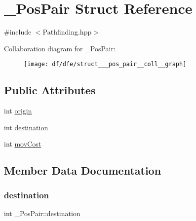 \hypertarget{struct___pos_pair}{}\section{\+\_\+\+Pos\+Pair Struct Reference}
\label{struct___pos_pair}


{\ttfamily \#include $<$Pathfinding.\+hpp$>$}



Collaboration diagram for \+\_\+\+Pos\+Pair\+:\nopagebreak
\begin{figure}[H]
\begin{center}
\leavevmode
\texttt{[image: df/dfe/struct\_\_\_pos\_pair\_\_coll\_\_graph]}
\end{center}
\end{figure}
\subsection*{Public Attributes}
\begin{DoxyCompactItemize}
\item 
int \mbox{\hyperlink{struct___pos_pair_a18ef19735976df84d1dda3185b844da0}{origin}}
\item 
int \mbox{\hyperlink{struct___pos_pair_a124d06bcfd8e7be752f9d32c0a7ce1bf}{destination}}
\item 
int \mbox{\hyperlink{struct___pos_pair_abf7f6970e1ace7a4f1cdc3179886e21d}{mov\+Cost}}
\end{DoxyCompactItemize}


\subsection{Member Data Documentation}
\mbox{\label{struct___pos_pair_a124d06bcfd8e7be752f9d32c0a7ce1bf}} 
\subsubsection{\texorpdfstring{destination}{destination}}
{\footnotesize\ttfamily int \+\_\+\+Pos\+Pair\+::destination}

\mbox{\label{struct___pos_pair_abf7f6970e1ace7a4f1cdc3179886e21d}} 
